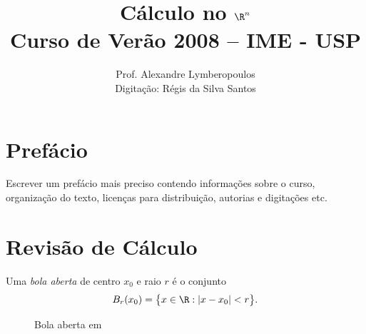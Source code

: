 \documentclass[11pt, oneside, a4paper]{gsm-l}
\title{Cálculo no $\R^n$ \\ Curso de Verão 2008 -- IME - USP}
\author{Prof. Alexandre Lymberopoulos\\ Digitação: Régis da Silva Santos}
\begin{document}

\frontmatter

\maketitle

\chapter*{Prefácio}

Escrever um prefácio mais preciso contendo informações sobre o curso,
organização do texto, licenças para distribuição, autorias e digitações
etc.







\tableofcontents
\listoffigures

\mainmatter

\chapter{Revisão de Cálculo}\label{revcalc}

\begin{defi}
  Uma \emph{bola aberta} de centro $x_0$ e raio $r$ é
  o conjunto \[B_r(x_0)=\big\{x\in\R:|x-x_0|<r\big\}.\]
  \begin{figure}[h]
    \centering
    
    \caption{Bola aberta em \R}
    \label{fig:bolaaberta}
  \end{figure}
\end{defi}
\end{document}
